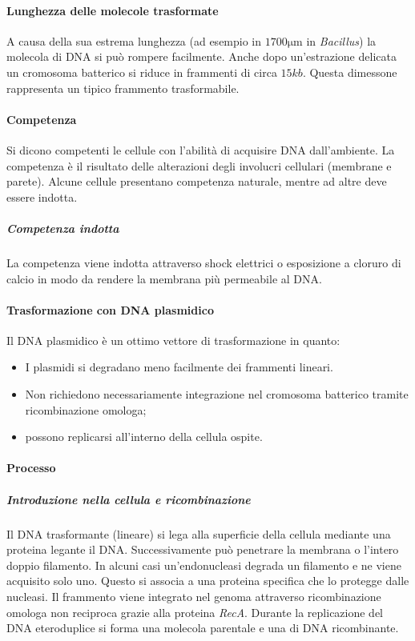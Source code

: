 			\paragraph{Lunghezza delle molecole trasformate}
			A causa della sua estrema lunghezza (ad esempio in $1700\si{\micro\metre}$ in \textit{Bacillus}) la molecola di DNA si può rompere facilmente. 
			Anche dopo un'estrazione delicata un cromosoma batterico si riduce in frammenti di circa $15kb$. 
			Questa dimessone rappresenta un tipico frammento trasformabile. 

			\paragraph{Competenza}
			Si dicono competenti le cellule con l'abilit\`a di acquisire DNA dall'ambiente.
			La competenza è il risultato delle alterazioni degli involucri cellulari (membrane e parete).
			Alcune cellule presentano competenza naturale, mentre ad altre deve essere indotta.

				\subparagraph{Competenza indotta}
				La competenza viene indotta attraverso shock elettrici o esposizione a cloruro di calcio in modo da rendere la membrana pi\`u permeabile al DNA.

			\paragraph{Trasformazione con DNA plasmidico} 
			Il DNA plasmidico \`e un ottimo vettore di trasformazione in quanto:
			\begin{multicols}{2}
				\begin{itemize}
    					\item I plasmidi si degradano meno facilmente dei frammenti lineari.
    					\item Non richiedono necessariamente integrazione nel cromosoma batterico tramite ricombinazione omologa; 
    					\item possono replicarsi all'interno della cellula ospite.
				\end{itemize}
			\end{multicols}

			\paragraph{Processo}

				\subparagraph{Introduzione nella cellula e ricombinazione}
    				Il DNA trasformante (lineare) si lega alla superficie della cellula mediante una proteina legante il DNA. 
				Successivamente pu\`o penetrare la membrana o l'intero doppio filamento.
				In alcuni casi un'endonucleasi degrada un filamento e ne viene acquisito solo uno.
				Questo si associa a una proteina specifica che lo protegge dalle nucleasi.
				Il frammento viene integrato nel genoma attraverso ricombinazione omologa non reciproca grazie alla proteina \emph{RecA}.
				Durante la replicazione del DNA eteroduplice si forma una molecola parentale e una di DNA ricombinante.

